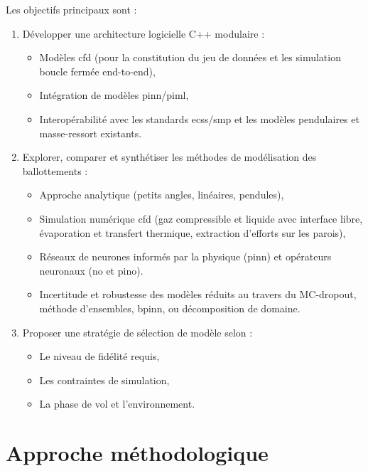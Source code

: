 \documentclass[12pt]{article}
\begin{document}
	Les objectifs principaux sont :
	\begin{enumerate}
		\item Développer une architecture logicielle C++ modulaire :
		\begin{itemize}
			\item Modèles \acrshort{cfd} (pour la constitution du jeu de données et les simulation boucle fermée end-to-end),
			\item Intégration de modèles \gls{pinn}/\acrshort{piml},
			\item Interopérabilité avec les standards \acrshort{ecss}/\acrshort{smp} et les modèles pendulaires et masse-ressort existants.
		\end{itemize}
		\item Explorer, comparer et synthétiser les méthodes de modélisation des ballottements :
		\begin{itemize}
			\item Approche analytique (petits angles, linéaires, pendules),
			\item Simulation numérique \acrshort{cfd} (gaz compressible et liquide avec interface libre, évaporation et transfert thermique, extraction d'efforts sur les parois),
			\item Réseaux de neurones informés par la physique (\gls{pinn}) et opérateurs neuronaux (\acrshort{no} et \acrshort{pino}).
			\item Incertitude et robustesse des modèles réduits au travers du MC-dropout, méthode d'ensembles, \acrshort{bpinn}, ou décomposition de domaine.
		\end{itemize}
		\item Proposer une stratégie de sélection de modèle selon :
		\begin{itemize}
			\item Le niveau de fidélité requis,
			\item Les contraintes de simulation,
			\item La phase de vol et l'environnement.
		\end{itemize}
	\end{enumerate}
	
	
	\section*{Approche méthodologique}
	
\end{document}
